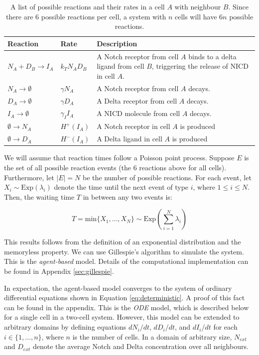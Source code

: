 \documentclass{article}
\begin{document}
\begin{flushleft}
\begin{table}[!htp]
\centering
\begin{tabular}{|m{8em}|m{5em}|m{20em}|} 
 \hline
 Reaction & Rate & Description \\ 
 \hline
 $N_{A} + D_{B} \rightarrow I_{A}$ & 
 $k_{T} N_{A}D_{B}$ &
 A Notch receptor from cell $A$ binds to a delta ligand from cell $B$, triggering the release of NICD in cell $A$. \\
 \hline
 $N_{A} \rightarrow \emptyset$ & 
 $\gamma N_{A}$ & 
 A Notch receptor from cell $A$ decays. \\
 \hline
 $D_{A} \rightarrow \emptyset$ & 
 $\gamma D_{A}$ & 
 A Delta receptor from cell $A$ decays. \\
 \hline
 $I_{A} \rightarrow \emptyset$ &
 $\gamma_{I} I_{A}$ &
 A NICD molecule from cell $A$ decays.  \\
 \hline
 $\emptyset \rightarrow N_{A}$ & 
 $H^{+}(I_{A})$ &
 A Notch receptor in cell $A$ is produced \\
 \hline
 $\emptyset \rightarrow D_{A}$ &
 $H^{-}(I_{A})$ &
 A Delta ligand in cell $A$ is produced \\
 \hline
\end{tabular}
\caption{
  A list of possible reactions and their rates in a cell $A$ with neighbour $B$.
  Since there are $6$ possible reactions per cell, a system with $n$ cells will have $6n$ possible reactions.
}
\label{tb:reactions}
\end{table}

\medskip

We will assume that reaction times follow a Poisson point process.
Suppose $E$ is the set of all possible reaction events (the $6$ reactions above for all cells).
Furthermore, let $|E| = N$ be the number of possible reactions.
For each event, let $X_{i} \sim \text{Exp}(\lambda_{i})$ denote the time until the next event of type $i$, where $1 \leq i \leq N$.
Then, the waiting time $T$ in between any two events is:

$$
T = \text{min} \{ X_{1}, \dots, X_{N} \} \sim \text{Exp}\left( \sum_{i = 1}^{N} \lambda_{i} \right) 
$$

This results follows from the definition of an exponential distribution and the memoryless property.
We can use Gillespie's algorithm to simulate the system.
This is the \emph{agent-based} model.
Details of the computational implementation can be found in Appendix \ref{sec:gillespie}.

\medskip

In expectation, the agent-based model converges to the system of ordinary differential equations shown in Equation \ref{eq:deterministic}.
A proof of this fact can be found in the appendix.
This is the \emph{ODE} model, which is described below for a single cell in a two-cell system.
However, this model can be extended to arbitrary domains by defining equations $dN_{i}/dt$, $dD_{i}/dt$, and $dI_{i}/dt$ for each $i \in \{ 1, \dots, n \}$, where $n$ is the number of cells.
In a domain of arbitrary size, $N_{ext}$ and $D_{ext}$ denote the average Notch and Delta concentration over all neighbours.


\end{flushleft}
\end{document}
